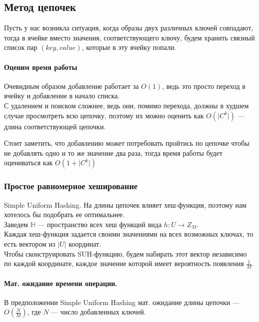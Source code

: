 \subsection{Метод цепочек}
Пусть у нас возникла ситуация, когда образы двух различных ключей совпадают, тогда в ячейке вместо значения, 
соответствующего ключу, будем хранить связный список пар $(key, value)$, которые в эту ячейку попали.

\paragraph{Оценим время работы}%
\label{par:Оценим время работы}
Очевидным образом добавление работает за $O(1)$, ведь это просто переход в ячейку и добавление в начало списка. \\
С удалением и поиском сложнее, ведь они, помимо перехода, должны в худшем случае просмотреть всю цепочку, 
поэтому их можно оценить как $O(\lvert C^k \rvert)$ --- длина соответствующей цепочки.

\begin{note}
    Стоит заметить, что добавлению может потребовать пройтись по цепочке чтобы не добавлять одно и то же значение два раза,
    тогда время работы будет оцениваться как $O(1 + \lvert C^k \rvert)$
\end{note}

\subsubsection{Простое равномерное хеширование}
Simple Uniform Hashing.
На длины цепочек влияет хеш-функция, поэтому нам хотелось бы подобрать ее оптимальнее. \\
Заведем $\mathbb{H}$ --- пространство всех хеш функций вида $h: U \to Z_M$. \\ 

Каждая хеш-функция задается своими значениями на всех возможных ключах, 
то есть вектором из $\lvert U \rvert$ координат. \\

Чтобы сконструировать SUH-функцию, будем набирать этот вектор независимо по каждой координате,
каждое значение которой имеет вероятность появления $\frac{1}{M}$.

\paragraph{Мат. ожидание времени операции.}
\begin{theorem}
    В предположении Simple Uniform Hashing мат. ожидание длины цепочки --- $O(\frac{N}{M})$, где $N$ --- число добавленных ключей.
\end{theorem}

